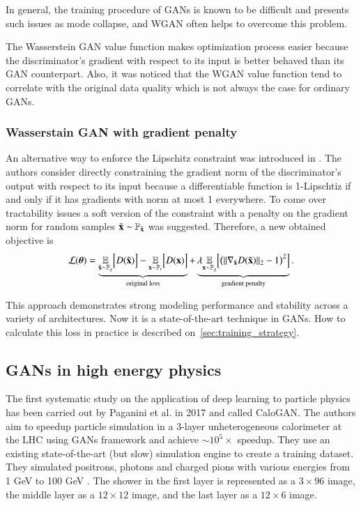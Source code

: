 In general, the training procedure of GANs is known to be difficult and presents such issues as mode collapse, and WGAN often helps to overcome this problem.

The Wasserstein GAN value function makes optimization process easier because the discriminator's gradient with respect to its input is better behaved than its GAN counterpart. Also, it was noticed that the WGAN value function tend to correlate with the original data quality which is not always the case for ordinary GANs.


\subsubsection{Wasserstain GAN with gradient penalty}
An alternative way to enforce the Lipschitz constraint was introduced in \cite{gulrajani2017improved}. The authors consider directly constraining the gradient norm of the discriminator's output with respect to its input because a differentiable function is 1-Lipschtiz if and only if it has gradients with norm at most 1 everywhere. To come over tractability issues a soft version of the constraint with a penalty on the gradient norm for random samples $\tilde{\mathbf{x}} \sim \mathbb{P}_{\tilde{\mathbf{x}}}$ was suggested. Therefore, a new obtained objective is 
\begin{equation} \label{gpwgan-loss}
\begin{gathered}
\mathcal{L}(\bm{\theta}) =
\underbrace{ \underset{\tilde{\mathbf{x}} \sim \mathbb{P}_g}{\mathbb{E}}  \Big[D(\tilde{\mathbf{x}})\Big] - \underset{\mathbf{x} \sim \mathbb{P}_r}{\mathbb{E}} \Big[D(\mathbf{x})\Big]}_{\text{original loss}} + 
\underbrace{ \lambda \underset{\mathbf{x} \sim \mathbb{P}_g}{\mathbb{E}} \Big[\big(\|\nabla_{\tilde{\mathbf{x}}} D(\tilde{\mathbf{x}})\|_2 - 1\big)^2 \Big]}_{\text{gradient penalty}}.
\end{gathered}
\end{equation}

This approach demonstrates strong modeling performance and stability across a variety of architectures.  Now it is a state-of-the-art technique in GANs. 
How to calculate this loss in practice is described on~\cref{sec:training_strategy}.

\subsection{GANs in high energy physics}
The first  systematic study on the application of deep learning to particle physics has been carried out by Paganini et al. in 2017 \cite{paganini2017calogan} and called CaloGAN. The authors aim to speedup particle simulation in a 3-layer unheterogeneous calorimeter at the LHC using GANs framework and achieve $\sim 10^5 \times$ speedup. They use an existing state-of-the-art (but slow) simulation engine \geant to create a training dataset. They simulated positrons, photons and charged pions with various energies from 1 GeV to 100 GeV . The shower in the first layer is represented as a $3 \times 96$ image, the middle layer as a $12 \times 12$ image, and the last layer as a $12 \times 6$ image. 

